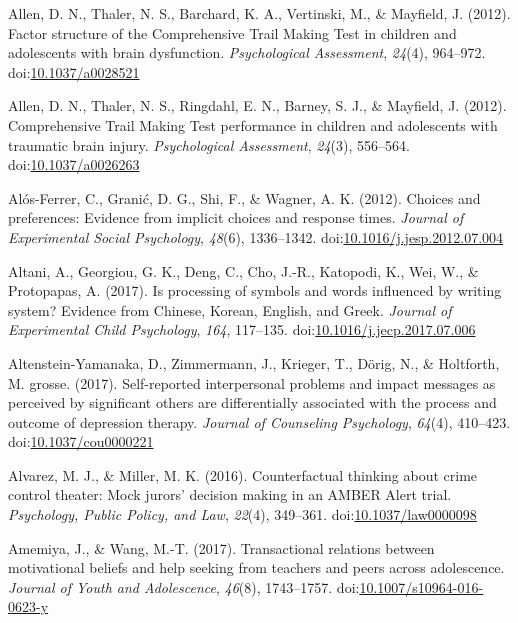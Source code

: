 \documentclass[english,man]{apa6}
\theoremstyle{definition}
\theoremstyle{definition}
\theoremstyle{definition}
\theoremstyle{remark}
\begin{document}
\hypertarget{ref-Allen2012a}{}
Allen, D. N., Thaler, N. S., Barchard, K. A., Vertinski, M., \&
Mayfield, J. (2012). Factor structure of the Comprehensive Trail Making
Test in children and adolescents with brain dysfunction.
\emph{Psychological Assessment}, \emph{24}(4), 964--972.
doi:\href{https://doi.org/10.1037/a0028521}{10.1037/a0028521}

\hypertarget{ref-Allen2012}{}
Allen, D. N., Thaler, N. S., Ringdahl, E. N., Barney, S. J., \&
Mayfield, J. (2012). Comprehensive Trail Making Test performance in
children and adolescents with traumatic brain injury.
\emph{Psychological Assessment}, \emph{24}(3), 556--564.
doi:\href{https://doi.org/10.1037/a0026263}{10.1037/a0026263}

\hypertarget{ref-Alos-Ferrer2012}{}
Alós-Ferrer, C., Granić, D. G., Shi, F., \& Wagner, A. K. (2012).
Choices and preferences: Evidence from implicit choices and response
times. \emph{Journal of Experimental Social Psychology}, \emph{48}(6),
1336--1342.
doi:\href{https://doi.org/10.1016/j.jesp.2012.07.004}{10.1016/j.jesp.2012.07.004}

\hypertarget{ref-Altani2017}{}
Altani, A., Georgiou, G. K., Deng, C., Cho, J.-R., Katopodi, K., Wei,
W., \& Protopapas, A. (2017). Is processing of symbols and words
influenced by writing system? Evidence from Chinese, Korean, English,
and Greek. \emph{Journal of Experimental Child Psychology}, \emph{164},
117--135.
doi:\href{https://doi.org/10.1016/j.jecp.2017.07.006}{10.1016/j.jecp.2017.07.006}

\hypertarget{ref-Altenstein-Yamanaka2017}{}
Altenstein-Yamanaka, D., Zimmermann, J., Krieger, T., Dörig, N., \&
Holtforth, M. grosse. (2017). Self-reported interpersonal problems and
impact messages as perceived by significant others are differentially
associated with the process and outcome of depression therapy.
\emph{Journal of Counseling Psychology}, \emph{64}(4), 410--423.
doi:\href{https://doi.org/10.1037/cou0000221}{10.1037/cou0000221}

\hypertarget{ref-Alvarez2016}{}
Alvarez, M. J., \& Miller, M. K. (2016). Counterfactual thinking about
crime control theater: Mock jurors' decision making in an AMBER Alert
trial. \emph{Psychology, Public Policy, and Law}, \emph{22}(4),
349--361.
doi:\href{https://doi.org/10.1037/law0000098}{10.1037/law0000098}

\hypertarget{ref-Amemiya2017}{}
Amemiya, J., \& Wang, M.-T. (2017). Transactional relations between
motivational beliefs and help seeking from teachers and peers across
adolescence. \emph{Journal of Youth and Adolescence}, \emph{46}(8),
1743--1757.
doi:\href{https://doi.org/10.1007/s10964-016-0623-y}{10.1007/s10964-016-0623-y}
\end{document}
